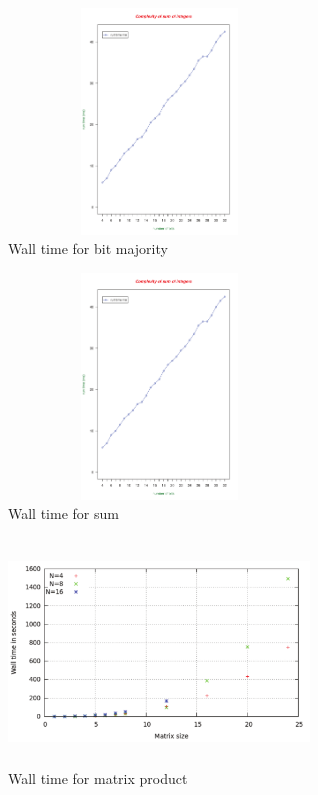 \documentclass{acm_proc_article-sp}
\begin{document}
\begin{figure}%
\centering
\includegraphics[width=8cm, height=6cm]{f8.pdf} 
\caption{Wall time for bit majority} 
\label{fig:image_sf0bis} %
\end{figure}
\begin{figure}%
\centering
\includegraphics[width=8cm, height=6cm]{f8.pdf} 
\caption{Wall time for sum} 
\label{fig:image_sf1} %
\end{figure}

\begin{figure}%
\centering
\includegraphics[width=8cm, height=6cm]{f9.pdf} 
\caption{Wall time for matrix product} 
\label{fig:image_sf2} %
\end{figure}
\end{document}
